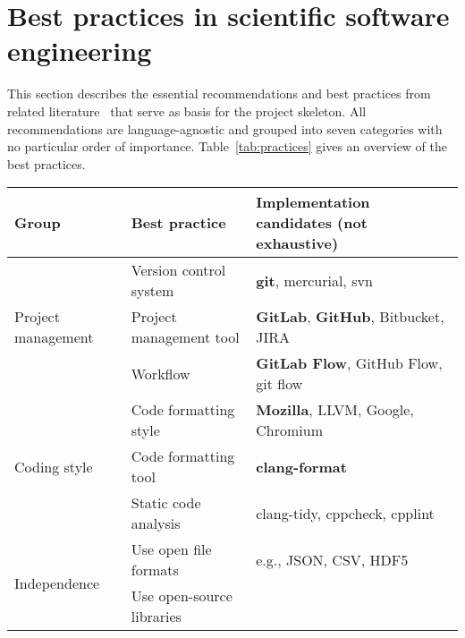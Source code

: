 \documentclass[@CLASSOPTIONS@]{tumarticle}
\begin{document}
\section{Best practices in scientific software engineering}
\label{sec:measures}

This section describes the essential recommendations and best practices from
related literature~\cite{nowogrodzki2019, hunt1999pragmatic, prlic2012, %
  bangerth2013, wilson2014, wilson2017, schlauch2018dlrguide, %
  netherlands-guide2019} that serve as basis for the project skeleton.
All recommendations are language-agnostic and grouped into seven categories
with no particular order of importance. Table~\ref{tab:practices} gives an
overview of the best practices.

\begin{table*}
  \centering
  \caption{Overview of best practices in software engineering for
    scientific software projects. For each best practice, implementation
    candidates are listed where the selected choice is denoted in bold.}
  \label{tab:practices}
  \begin{tabular}{lll}
    \hline
    \textbf{Group}                      & \textbf{Best practice}        &
    \textbf{Implementation candidates (not exhaustive)}
    \\
    \hline
    \multirow{3}{*}{Project management} & Version control system        &
    \textbf{git}, mercurial, svn
    \\
    \cline{2-3}
                                        & Project management tool       &
    \textbf{GitLab}, \textbf{GitHub}, Bitbucket, JIRA
    \\
    \cline{2-3}
                                        & Workflow                      &
    \textbf{GitLab Flow}, GitHub Flow, git flow
    \\
    \hline
    \multirow{3}{*}{Coding style}       & Code formatting style         &
    \textbf{Mozilla}, LLVM, Google, Chromium
    \\
    \cline{2-3}
                                        & Code formatting tool          &
    \textbf{clang-format}
    \\
    \cline{2-3}
                                        & Static code analysis          &
    clang-tidy, cppcheck, cpplint
    \\
    \hline
    \multirow{2}{*}{Independence}       & Use open file formats         &
    e.g., JSON, CSV, HDF5
    \\
    \cline{2-3}
                                        & Use open-source libraries     &

\end{tabular}
\end{table*}
\end{document}
